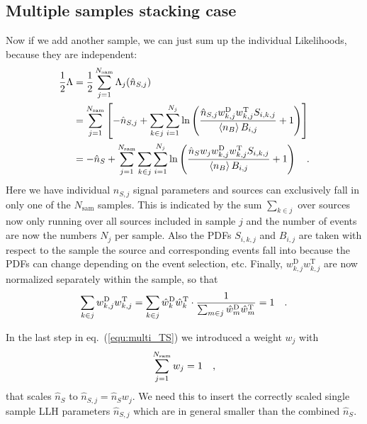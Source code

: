 \subsection{Multiple samples stacking case}

Now if we add another sample, we can just sum up the individual Likelihoods, because they are independent:
\begin{align}
  \frac{1}{2}\Lambda
    &= \frac{1}{2} \sum_{j=1}^{N_\text{sam}} \Lambda_j(\hat{n}_{S,j}) \\
    &= \sum_{j=1}^{N_\text{sam}} \left[
        -\hat{n}_{S,j} + \sum_{k\in j}\sum_{i=1}^{N_j} \ln\left(
          \frac{\hat{n}_{S,j} w_{k,j}^\text{D}w_{k,j}^\text{T}S_{i,k,j}}
               {\Braket{n_B} B_{i,j}} + 1
        \right)
      \right] \\
    &=  -\hat{n}_S + \sum_{j=1}^{N_\text{sam}}
          \sum_{k\in j}\sum_{i=1}^{N_j} \ln\left(
            \frac{\hat{n}_S w_j w_{k,j}^\text{D}w_{k,j}^\text{T}S_{i,k,j}}
                 {\Braket{n_B} B_{i,j}} + 1
        \right) \quad\text{.}
\label{equ:multi_TS}
\end{align}
Here we have individual $n_{S,j}$ signal parameters and sources can exclusively fall in only one of the $N_\text{sam}$ samples.
This is indicated by the sum $\sum_{k\in j}$ over sources now only running over all sources included in sample $j$ and the number of events are now the numbers $N_j$ per sample.
Also the PDFs $S_{i,k,j}$ and $B_{i,j}$ are taken with respect to the sample the source and corresponding events fall into because the PDFs can change depending on the event selection, etc.
Finally, $w_{k,j}^\text{D} w_{k,j}^\text{T}$ are now normalized separately within the sample, so that
\begin{equation}
  \sum_{k\in j} w_{k,j}^\text{D} w_{k,j}^\text{T}
  = \sum_{k\in j} \hat{w}_k^\text{D} \hat{w}_k^\text{T} \cdot
    \frac{1}{\sum_{m\in j} \hat{w}_m^\text{D} \hat{w}_m^\text{T}}
  = 1
  \quad\text{.}
  \label{equ:multi_norm}
\end{equation}

In the last step in eq.~(\ref{equ:multi_TS}) we introduced a weight $w_j$ with
\begin{equation}
  \sum_{j=1}^{N_\text{sam}} w_j = 1 \quad\text{,}
\end{equation}
that scales $\hat{n}_S$ to $\hat{n}_{S,j} = \hat{n}_S w_j$.
We need this to insert the correctly scaled single sample LLH parameters $\hat{n}_{S,j}$ which are in general smaller than the combined $\hat{n}_S$.


